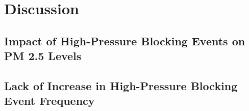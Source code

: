\section{Discussion}
\subsection{Impact of High-Pressure Blocking Events on PM 2.5 Levels}

\subsection{Lack of Increase in High-Pressure Blocking Event Frequency}